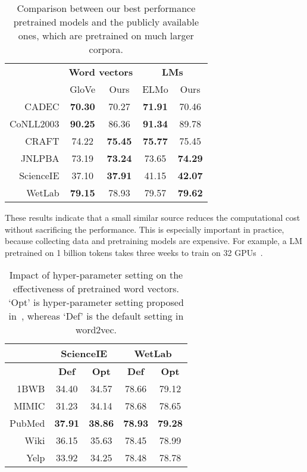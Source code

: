 \documentclass[11pt,a4paper]{article}
\begin{document}
\begin{table}[tb]
    \centering
    \begin{small}
    \begin{tabular}{r|cc|cc}
    \toprule
     & \multicolumn{2}{c}{\bf Word vectors} & \multicolumn{2}{|c}{\bf LMs} \\
     & GloVe & Ours & ELMo & Ours \\ \midrule
     CADEC & \bf 70.30 & 70.27 & \bf 71.91 & 70.46 \\
     CoNLL2003 & \bf 90.25 & 86.36 & \bf 91.34 & 89.78 \\
     CRAFT & 74.22 & \bf 75.45 & \bf 75.77 & 75.45 \\
     JNLPBA & 73.19 & \bf 73.24 & 73.65 & \bf 74.29 \\
     ScienceIE & 37.10 & \bf 37.91 & 41.15 & \bf 42.07 \\
     WetLab & \bf 79.15 & 78.93 & 79.57 & \bf 79.62 \\
     \bottomrule
     \end{tabular}
     \caption{\label{tab:compare-public}Comparison between our best performance pretrained models and the publicly available ones, which are pretrained on much larger corpora.}
    \end{small}
\end{table}

These results indicate that a small similar source reduces the computational cost without sacrificing the performance. This is especially important in practice, because collecting data and pretraining models are expensive. For example, a LM pretrained on 1 billion tokens takes three weeks to train on 32 GPUs~\citep{Jozefowicz:Vinyals:arXiv:2016}. 

\begin{table}[pt!]
    \centering
    \begin{small}
    \begin{tabular}{r|c|c|c|c}
    \toprule
    & \multicolumn{2}{c}{\bf ScienceIE} & \multicolumn{2}{c}{\bf WetLab} \\ \hline
    \bf & \bf Def & \bf Opt & \bf Def & \bf Opt \\ \hline
    1BWB & 34.40 & 34.57 & 78.66 & 79.12 \\
    MIMIC & 31.23 & 34.14 & 78.68 & 78.65 \\
    PubMed & \bf 37.91 & \bf 38.86 & \bf 78.93 & \bf 79.28 \\
    Wiki & 36.15 & 35.63 & 78.45 & 78.99 \\
    Yelp & 33.92 & 34.25 & 78.48 & 78.78 \\
    \bottomrule
    \end{tabular}
    \caption{Impact of hyper-parameter setting on the effectiveness of pretrained word vectors. `Opt' is hyper-parameter setting proposed in~\citep{Chiu:Crichton:BioNLP:2016}, whereas `Def' is the default setting in word2vec.}
    \label{tab:best-hyper-parameter}
    \end{small}
\end{table}
\end{document}
